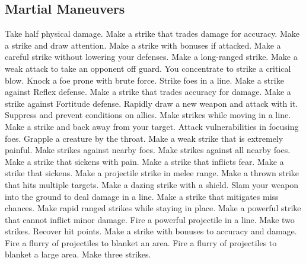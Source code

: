\small
\subsection{Martial Maneuvers}\label{Martial Maneuvers}
\begin{spelllist}
 Take half physical damage.
 Make a strike that trades damage for accuracy.
 Make a strike and draw attention.
 Make a strike with bonuses if attacked.
 Make a careful strike without lowering your defenses.
 Make a long-ranged strike.
 Make a weak attack to take an opponent off guard.
 You concentrate to strike a critical blow.
 Knock a foe prone with brute force.
 Strike foes in a line.
 Make a strike against Reflex defense.
 Make a strike that trades accuracy for damage.
 Make a strike against Fortitude defense.
 Rapidly draw a new weapon and attack with it.
 Suppress and prevent conditions on allies.
 Make strikes while moving in a line.
 Make a strike and back away from your target.
 Attack vulnerabilities in focusing foes.
 Grapple a creature by the throat.
 Make a weak strike that is extremely painful.
 Make strikes against nearby foes.
 Make strikes against all nearby foes.
 Make a strike that sickens with pain.
 Make a strike that inflicts fear.
 Make a strike that sickens.
 Make a projectile strike in melee range.
 Make a thrown strike that hits multiple targets.
 Make a dazing strike with a shield.
 Slam your weapon into the ground to deal damage in a line.
 Make a strike that mitigates miss chances.
 Make rapid ranged strikes while staying in place.
 Make a powerful strike that cannot inflict minor damage.
 Fire a powerful projectile in a line.
 Make two strikes.
 Recover hit points.
 Make a strike with bonuses to accuracy and damage.
 Fire a flurry of projectiles to blanket an area.
 Fire a flurry of projectiles to blanket a large area.
 Make three strikes.
\end{spelllist}



